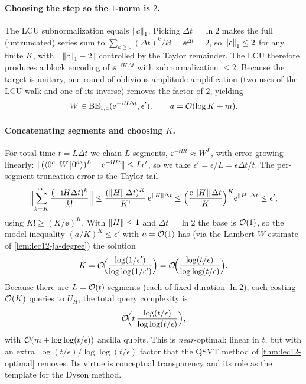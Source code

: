 \paragraph{Choosing the step so the $1$-norm is $2$.}
The LCU subnormalization equals $\left\lVert c \right\rVert_1$. Picking $\Delta t=\ln2$ makes the full
(untruncated) series sum to $\sum_{k\ge0}(\Delta t)^k/k!=\ee^{\Delta t}=2$, so
$\left\lVert c \right\rVert_1\le2$ for any finite $K$, with $|\,\left\lVert c \right\rVert_1-2\,|$ controlled by the Taylor
remainder. The LCU therefore produces a block encoding of $\ee^{-\ii H\Delta t}$ with
subnormalization $\le2$. Because the target is unitary, one round of oblivious amplitude
amplification (two uses of the LCU walk and one of its inverse) removes the factor of $2$,
yielding
\begin{equation}
  W\in\mathrm{BE}_{1,a}(\mathrm{e}^{-\mathrm{i} H\Delta t},\epsilon'),
  \qquad a=\mathcal{O}(\log K+m).
  \label{eq:lec12-taylor-W}
\end{equation}

\paragraph{Concatenating segments and choosing $K$.}
For total time $t=L\Delta t$ we chain $L$ segments, $\ee^{-\ii Ht}\approx W^L$, with error
growing linearly: $\|(\bra{0^a}W\ket{0^a})^L-\mathrm{e}^{-\mathrm{i} Ht}\|\le L\epsilon'$, so we take
$\epsilon'=\epsilon/L=\epsilon\Delta t/t$. The per-segment truncation error is the Taylor
tail
\begin{equation}
  \Bigl\|\sum_{k=K}^{\infty}\frac{(-\mathrm{i} H\Delta t)^k}{k!}\Bigr\|
  \le\frac{(\left\lVert H \right\rVert\Delta t)^K}{K!}\,\mathrm{e}^{\left\lVert H \right\rVert\Delta t}
  \le\Bigl(\frac{\mathrm{e}\left\lVert H \right\rVert\Delta t}{K}\Bigr)^K\mathrm{e}^{\left\lVert H \right\rVert\Delta t}\le\epsilon',
  \label{eq:lec12-taylor-tail}
\end{equation}
using $K!\ge(K/\ee)^K$. With $\left\lVert H \right\rVert\le1$ and $\Delta t=\ln2$ the base is $\mathcal{O}(1)$, so
the model inequality $(a/K)^K\le\epsilon'$ with $a=\mathcal{O}(1)$ has (via the Lambert-$W$
estimate of \cref{lem:lec12-ja-degree}) the solution
\begin{equation}
  K=\mathcal{O}\!\Bigl(\frac{\log(1/\epsilon')}{\log\log(1/\epsilon')}\Bigr)
   =\mathcal{O}\!\Bigl(\frac{\log(t/\epsilon)}{\log\log(t/\epsilon)}\Bigr).
  \label{eq:lec12-taylor-K}
\end{equation}
Because there are $L=\mathcal{O}(t)$ segments (each of fixed duration $\ln2$), each costing
$\mathcal{O}(K)$ queries to $U_H$, the total query complexity is
\begin{equation}
  \mathcal{O}\!\Bigl(t\,\frac{\log(t/\epsilon)}{\log\log(t/\epsilon)}\Bigr),
  \label{eq:lec12-taylor-cost}
\end{equation}
with $\mathcal{O}(m+\log\log(t/\epsilon))$ ancilla qubits. This is \emph{near}-optimal: linear in
$t$, but with an extra $\log(t/\epsilon)/\log\log(t/\epsilon)$ factor that the QSVT method
of \cref{thm:lec12-optimal} removes. Its virtue is conceptual transparency and its role as
the template for the Dyson method.

